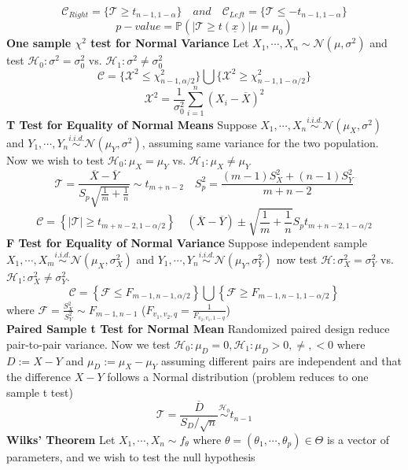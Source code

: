 \documentclass[8pt]{article}
\begin{document}
\begin{multicols}{3}
{\[   \]
   \[
    \mathcal{C}_{Right} = \{ \mathcal{T}\geq t_{n-1, 1 - \alpha}\} \quad and\quad \mathcal{C}_{Left} = \{ \mathcal{T}\leq -t_{n-1, 1 - \alpha}\}
   \]
   \[
    p-value = \mathbb{P}\left( |\mathcal{T} \geq t(\underline{x}) | \mu =\mu_0 \right)
   \]
   \textbf{One sample $\chi^2$ test for Normal Variance} Let $X_1, \cdots, X_n\sim \mathcal{N}(\mu, \sigma^2)$ and test $\mathcal{H}_0: \sigma^2 = \sigma^2_0$ vs. $\mathcal{H}_1: \sigma^2 \neq \sigma^2_0$
   \[
      \mathcal{C} = \{ \mathcal{X}^2 \leq \chi^2_{n-1, \alpha/2} \} \bigcup \{ \mathcal{X}^2 \geq \chi^2_{n-1, 1-\alpha/2}\}
   \]
   \[
    \mathcal{X}^2 = \frac{1}{\sigma^2_0}\sum_{i=1}^n (X_i - \overline{X})^2
   \]
   \textbf{T Test for Equality of Normal Means} Suppose $X_1, \cdots, X_n \stackrel{i.i.d.}{\sim} \mathcal{N}(\mu_X, \sigma^2)$ and  $Y_1, \cdots, Y_n \stackrel{i.i.d.}{\sim} \mathcal{N}(\mu_Y, \sigma^2)$, assuming same variance for the two population. Now we wish to test $\mathcal{H}_0: \mu_X = \mu_Y$ vs. $\mathcal{H}_1:\mu_X \neq \mu_Y$
   \[
      \mathcal{T} = \frac{\overline{X} - \overline{Y}}{S_p \sqrt{\frac{1}{m} + \frac{1}{n}}} \sim t_{m+n-2} \quad S_p^2 = \frac{(m-1)S_X^2 + (n-1)S_Y^2}{m+n-2}
   \]
   \[
    \mathcal{C} = \left\{ |\mathcal{T}| \geq t_{m+n-2, 1-\alpha/2} \right\} \quad (\overline{X} - \overline{Y}) \pm \sqrt{\frac{1}{m} + \frac{1}{n}} S_p t_{m+n-2, 1-\alpha/2}
   \]
   \textbf{F Test for Equality of Normal Variance} Suppose independent sample $X_1, \cdots, X_m \stackrel{i.i.d.}{\sim} \mathcal{N}(\mu_X, \sigma_X^2)$ and $Y_1, \cdots, Y_n \stackrel{i.i.d.}{\sim}\mathcal{N}(\mu_Y, \sigma_Y^2)$ now test $\mathcal{H}: \sigma_X^2 = \sigma_Y^2$ vs. $\mathcal{H}_1: \sigma_X^2 \neq \sigma_Y^2$.
   \[
     \mathcal{C} =  \left\{ \mathcal{F} \leq F_{m-1, n-1, \alpha/2} \right\} \bigcup \left\{ \mathcal{F} \geq F_{m-1, n-1, 1-\alpha/2} \right\}
   \]
   where $\mathcal{F} = \frac{S_X^2}{S_Y^2} \sim F_{m-1, n-1}$ ($F_{v_1, v_2, q} = \frac{1}{F_{v_2, v_1, 1-q}}$)\\
   \textbf{Paired Sample t Test for Normal Mean} Randomized paired design reduce pair-to-pair variance. Now we test $\mathcal{H}_0: \mu_D = 0, \mathcal{H}_1: \mu_D > 0, \neq, < 0$ where $D := X - Y$ and $\mu_D := \mu_X - \mu_Y$ assuming different pairs are independent and that the difference $X-Y$ follows a Normal distribution (problem reduces to one sample t test)
   \[
      \mathcal{T} = \frac{\overline{D}}{S_D / \sqrt{n}} \stackrel{\mathcal{H}_0}{\sim} t_{n-1}
   \]
   \textbf{Wilks' Theorem} Let $X_1, \cdots, X_n \sim f_{\theta}$ where $\theta = (\theta_1, \cdots, \theta_p)\in \Theta$ is a vector of parameters, and we wish to test the null hypothesis
}
\end{multicols}
\end{document}
